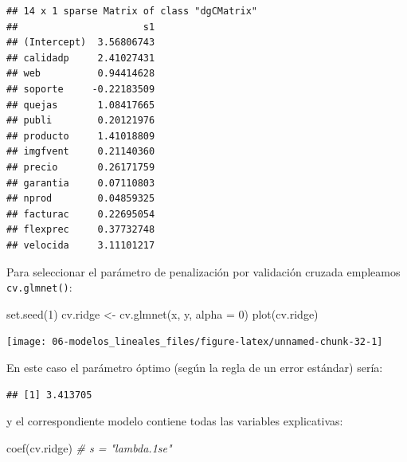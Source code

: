 \documentclass[
]{book}
\newenvironment{Shaded}{\begin{snugshade}}{\end{snugshade}}
\newcommand{\AttributeTok}[1]{\textcolor[rgb]{0.77,0.63,0.00}{#1}}
\newcommand{\CommentTok}[1]{\textcolor[rgb]{0.56,0.35,0.01}{\textit{#1}}}
\newcommand{\DecValTok}[1]{\textcolor[rgb]{0.00,0.00,0.81}{#1}}
\newcommand{\FloatTok}[1]{\textcolor[rgb]{0.00,0.00,0.81}{#1}}
\newcommand{\FunctionTok}[1]{\textcolor[rgb]{0.00,0.00,0.00}{#1}}
\newcommand{\NormalTok}[1]{#1}
\newcommand{\OtherTok}[1]{\textcolor[rgb]{0.56,0.35,0.01}{#1}}
\newcommand{\SpecialCharTok}[1]{\textcolor[rgb]{0.00,0.00,0.00}{#1}}
\theoremstyle{break}
\theoremstyle{definition}
\theoremstyle{definition}
\theoremstyle{definition}
\theoremstyle{definition}
\theoremstyle{remark}
\begin{document}
\begin{verbatim}
## 14 x 1 sparse Matrix of class "dgCMatrix"
##                      s1
## (Intercept)  3.56806743
## calidadp     2.41027431
## web          0.94414628
## soporte     -0.22183509
## quejas       1.08417665
## publi        0.20121976
## producto     1.41018809
## imgfvent     0.21140360
## precio       0.26171759
## garantia     0.07110803
## nprod        0.04859325
## facturac     0.22695054
## flexprec     0.37732748
## velocida     3.11101217
\end{verbatim}

Para seleccionar el parámetro de penalización por validación cruzada empleamos \texttt{cv.glmnet()}:

\begin{Shaded}
\begin{Highlighting}[]
\FunctionTok{set.seed}\NormalTok{(}\DecValTok{1}\NormalTok{)}
\NormalTok{cv.ridge }\OtherTok{\textless{}{-}} \FunctionTok{cv.glmnet}\NormalTok{(x, y, }\AttributeTok{alpha =} \DecValTok{0}\NormalTok{)}
\FunctionTok{plot}\NormalTok{(cv.ridge)}
\end{Highlighting}
\end{Shaded}

\begin{center}\texttt{[image: 06-modelos\_lineales\_files/figure-latex/unnamed-chunk-32-1]} \end{center}

En este caso el parámetro óptimo (según la regla de un error estándar) sería:

\begin{Shaded}
\end{Shaded}

\begin{verbatim}
## [1] 3.413705
\end{verbatim}

\begin{Shaded}
\end{Shaded}

y el correspondiente modelo contiene todas las variables explicativas:

\begin{Shaded}
\begin{Highlighting}[]
\FunctionTok{coef}\NormalTok{(cv.ridge) }\CommentTok{\# s = "lambda.1se"}
\end{Highlighting}
\end{Shaded}
\end{document}

